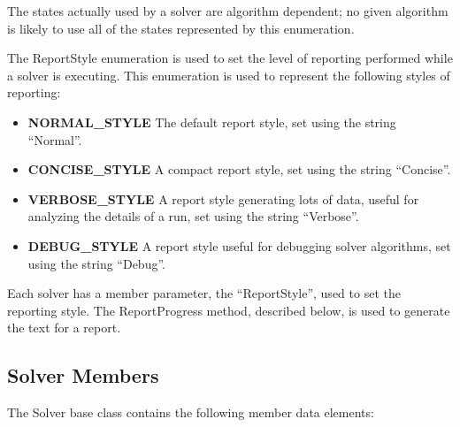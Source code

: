 \noindent The states actually used by a solver are algorithm dependent; no given algorithm is likely
to use all of the states represented by this enumeration.

The ReportStyle enumeration is used to set the level of reporting performed while a solver is
executing.  This enumeration is used to represent the following styles of reporting:

\begin{itemize}
\item \textbf{NORMAL\_STYLE} The default report style, set using the string ``Normal''.
\item \textbf{CONCISE\_STYLE} A compact report style, set using the string ``Concise''.
\item \textbf{VERBOSE\_STYLE} A report style generating lots of data, useful for analyzing the
details of a run, set using the string ``Verbose''.
\item \textbf{DEBUG\_STYLE} A report style useful for debugging solver algorithms, set using the
string ``Debug''.
\end{itemize}

\noindent Each solver has a member parameter, the ``ReportStyle'', used to set the reporting style.
The ReportProgress method, described below, is used to generate the text for a report.

\subsection{Solver Members}

The Solver base class contains the following member data elements:

